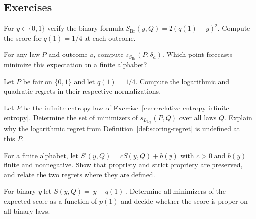 \documentclass[11pt,oneside]{book}
\theoremstyle{definition}
\theoremstyle{remark}
\begin{document}
\subsection{Exercises}
\label{subsec:practice-3-4}

\begin{practiceexercise}
\label{pex:quadratic-score-binary-normalization}
For $y\in\{0,1\}$ verify the binary formula
$S_{\mathrm{Br}}(y,Q)=2(q(1)-y)^2$. Compute the score for
$q(1)=1/4$ at each outcome.
\end{practiceexercise}

\begin{practiceexercise}
\label{pex:quadratic-score-point-forecast}
For any law $P$ and outcome $a$, compute $s_{S_{\mathrm{Br}}}(P,\delta_a)$.
Which point forecasts minimize this expectation on a finite alphabet?
\end{practiceexercise}

\begin{practiceexercise}
\label{pex:proper-score-log-and-quadratic-regrets}
Let $P$ be fair on $\{0,1\}$ and let $q(1)=1/4$. Compute the
logarithmic and quadratic regrets in their respective normalizations.
\end{practiceexercise}

\begin{practiceexercise}
\label{pex:proper-score-infinite-log-entropy}
Let $P$ be the infinite-entropy law of
Exercise~\ref{exer:relative-entropy-infinite-entropy}. Determine the
set of minimizers of $s_{L_{\log}}(P,Q)$ over all laws $Q$.
Explain why the logarithmic regret from
Definition~\ref{def:scoring-regret} is undefined at this $P$.
\end{practiceexercise}

\begin{practiceexercise}
\label{pex:proper-score-shift-and-scale}
For a finite alphabet, let $S'(y,Q)=cS(y,Q)+b(y)$ with
$c>0$ and $b(y)$ finite and nonnegative. Show that propriety
and strict propriety are preserved, and relate the two regrets
where they are defined.
\end{practiceexercise}

\begin{practiceexercise}
\label{pex:proper-score-absolute-probability}
For binary $y$ let $S(y,Q)=|y-q(1)|$. Determine all minimizers
of the expected score as a function of $p(1)$ and decide whether
the score is proper on all binary laws.
\end{practiceexercise}
\end{document}
